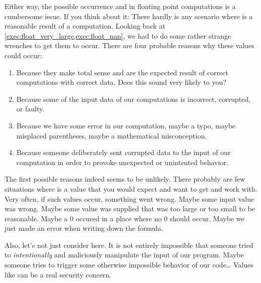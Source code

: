Either way, the possible occurrence  and  in floating point computations is a cumbersome issue.
If you think about it:
There hardly is any scenario where  is a reasonable result of a computation.
Looking back at \cref{exec:float_very_large,exec:float_nan}, we had to do some rather strange wrenches to get them to occur.
There are four probable reasons why these values could occur:%
%
\begin{enumerate}%
%
\item Because they make total sense and are the expected result of correct computations with correct data.
Does this sound very likely to you?%
%
\item Because some of the input data of our computations is incorrect, corrupted, or faulty.%
%
\item Because we have some error in our computation, maybe a typo, maybe misplaced parentheses, maybe a mathematical misconception.%
%
\item Because someone deliberately sent corrupted data to the input of our computation in order to provoke unexpected or unintented behavior.%
%
\end{enumerate}%
%
The first possible reasons indeed seems to be unlikely.
There probably are few situations where  is a value that you would expect and want to get and work with.
Very often, if such values occur, something went wrong.
Maybe some input value was wrong.
Maybe some value was supplied that was too large or too small to be reasonable.
Maybe a 0 occured in a place where no 0 should occur.
Maybe we just made an error when writing down the formula.

Also, let's not just consider  here.
It is not entirely impossible that someone tried to \emph{intentionally} and maliciously manipulate the input of our program.
Maybe someone tries to trigger some otherwise impossible behavior of our code\dots
Values like  can be a real security concern.

